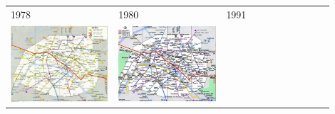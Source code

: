 \hspace{-0.5cm}
\begin{tabular}{|m{0.3\linewidth}|m{0.3\linewidth}|m{0.3\linewidth}|}
\hline
1978 & 1980 & 1991\\
\includegraphics[width=\linewidth]{img/1978}&
\includegraphics[width=\linewidth]{img/1980}&

\end{tabular}
